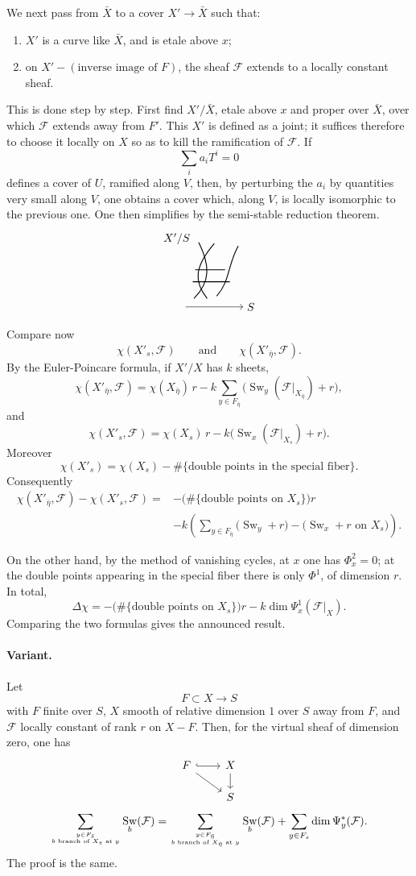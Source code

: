 \documentclass[11pt]{article}
\newcommand{\semistableCoverSketch}{%
\begin{tikzpicture}[scale=.75,baseline=-.5ex]
  \draw[->] (-.2,0) -- (2.2,0) node[right]{$S$};
  \draw[thick] (.15,.35) .. controls (.85,1.05) and (.82,1.75) .. (.35,2.7);
  \draw[thick] (.7,.35) .. controls (.15,1.05) and (.15,1.65) .. (1.0,2.65);
  \draw[thick] (1.1,.45) .. controls (1.65,1.05) and (1.55,1.75) .. (2.0,2.55);
  \draw[thick] (.1,1.05) -- (1.65,1.05);
  \draw[thick] (.2,1.55) -- (1.45,1.55);
  \node[left] at (.15,2.85){$X'/S$};
\end{tikzpicture}%
}
\newcommand{\F}{\mathcal F}
\DeclareMathOperator{\Sw}{Sw}
\begin{document}
We next pass from \(\bar X\) to a cover \(X'\to\bar X\) such that:
\begin{enumerate}[label=\alph*)]
\item \(X'\) is a curve like \(\bar X\), and is etale above \(x\);
\item on \(X'-(\text{inverse image of }F)\), the sheaf \(\F\) extends to a locally constant sheaf.
\end{enumerate}

This is done step by step. First find \(X'/\bar X\), etale above \(x\) and proper over \(\bar X\), over which \(\F\) extends away from \(F'\). This \(X'\) is defined as a joint; it suffices therefore to choose it locally on \(X\) so as to kill the ramification of \(\F\). If
\[
  \sum_i a_i T^i=0
\]
defines a cover of \(U\), ramified along \(V\), then, by perturbing the \(a_i\) by quantities very small along \(V\), one obtains a cover which, along \(V\), is locally isomorphic to the previous one. One then simplifies by the semi-stable reduction theorem.
\[
\semistableCoverSketch
\]

Compare now
\[
  \chi(X'_s,\F)\qquad\text{and}\qquad \chi(X'_{\bar\eta},\F).
\]
By the Euler-Poincare formula, if \(X'/X\) has \(k\) sheets,
\[
 \chi(X'_{\bar\eta},\F)
 =\chi(X_{\bar\eta})\,r
 -k\sum_{y\in F_{\bar\eta}}
   \bigl(\Sw_y(\F|_{X_{\bar\eta}})+r\bigr),
\]
and
\[
 \chi(X'_s,\F)
 =\chi(X_s)\,r
 -k\bigl(\Sw_x(\F|_{X_s})+r\bigr).
\]
Moreover
\[
  \chi(X'_s)=\chi(X_s)-
  \#\{\text{double points in the special fiber}\}.
\]
Consequently
\[
\begin{aligned}
\chi(X'_{\bar\eta},\F)-\chi(X'_s,\F)
={}&-\bigl(\#\{\text{double points on }X_s\}\bigr)r \\
&-k\left(
 \sum_{y\in F_{\bar\eta}}
 \bigl(\Sw_y+r\bigr)
 -\bigl(\Sw_x+r\text{ on }X_s\bigr)
\right).
\end{aligned}
\]

On the other hand, by the method of vanishing cycles, at \(x\) one has \(\Phi_x^2=0\); at the double points appearing in the special fiber there is only \(\Phi^1\), of dimension \(r\). In total,
\[
  \Delta\chi
  =-\bigl(\#\{\text{double points on }X_s\}\bigr)r
   -k\dim \Psi_x^1(\F|_X).
\]
Comparing the two formulas gives the announced result.

\paragraph{Variant.}
Let
\[
  F\subset X\longrightarrow S
\]
with \(F\) finite over \(S\), \(X\) smooth of relative dimension \(1\) over \(S\) away from \(F\), and \(\F\) locally constant of rank \(r\) on \(X-F\). Then, for the virtual sheaf of dimension zero, one has
\[
\begin{tikzcd}[column sep=2.2em,row sep=1.4em]
F \arrow[r, hook] \arrow[dr] & X \arrow[d] \\
& S
\end{tikzcd}
\]
\[
\sum_{y\in F_{\bar s}\atop b\text{ branch of }X_s\text{ at }y}
\Sw_b(\F)
=
\sum_{y\in F_{\bar\eta}\atop b\text{ branch of }X_{\bar\eta}\text{ at }y}
\Sw_b(\F)
+
\sum_{y\in F_s}\dim \Psi_y^*(\F).
\]
The proof is the same.
\end{document}
